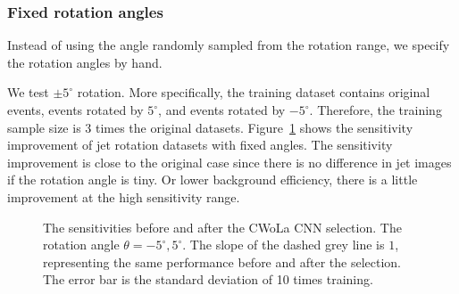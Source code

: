 \documentclass[12pt]{article}
\begin{document}
        \subsubsection{Fixed rotation angles}%
        \label{subs:fixed_rotation_angles}
            Instead of using the angle randomly sampled from the rotation range, we specify the rotation angles by hand.

            We test $\pm 5^\circ$ rotation. More specifically, the training dataset contains original events, events rotated by $5^\circ$, and events rotated by $-5^\circ$. Therefore, the training sample size is 3 times the original datasets. Figure~\ref{fig:sensitivity_improvement_origin_jet_aug_angles_-5_5} shows the sensitivity improvement of jet rotation datasets with fixed angles. The sensitivity improvement is close to the original case since there is no difference in jet images if the rotation angle is tiny. Or lower background efficiency, there is a little improvement at the high sensitivity range.
        \begin{figure}[htpb]
            \centering
            \caption{The sensitivities before and after the CWoLa CNN selection. The rotation angle $\theta = -5^\circ, 5^\circ$. The slope of the dashed grey line is $1$, representing the same performance before and after the selection. The error bar is the standard deviation of 10 times training.}
            \label{fig:sensitivity_improvement_origin_jet_aug_angles_-5_5}
        \end{figure}
\end{document}
